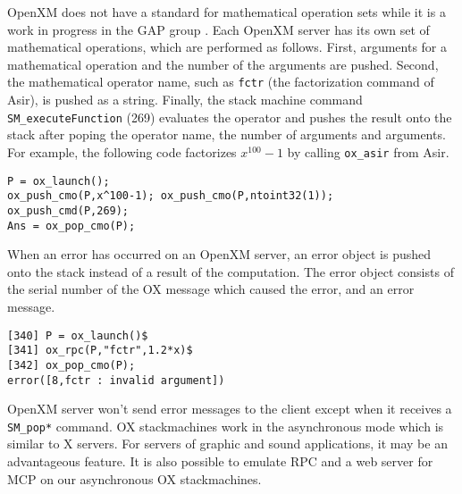 OpenXM does not have a standard for mathematical operation sets
while it is a work in progress in the GAP group \cite{gap}.
Each OpenXM server has its own set of mathematical operations,
which are performed as follows.
First, arguments for a mathematical operation
and the number of the arguments are pushed.
Second, 
the mathematical operator name, 
such as {\tt fctr} (the factorization command of Asir),
is pushed as a string.
Finally, the stack machine command
{\tt SM\_executeFunction} (269) evaluates the operator and
pushes the result onto the stack
after poping the operator name, the number of arguments
and arguments.
For example, the following code factorizes $x^{100}-1$ by calling
{\tt ox\_asir} from Asir.
\begin{verbatim}
P = ox_launch(); 
ox_push_cmo(P,x^100-1); ox_push_cmo(P,ntoint32(1));
ox_push_cmd(P,269); 
Ans = ox_pop_cmo(P);
\end{verbatim}

When an error has occurred on an OpenXM server,
an error object is pushed onto the stack 
instead of a result of the computation.
The error object consists of the serial number of the OX message
which caused the error, and an error message.
\begin{verbatim}
[340] P = ox_launch()$
[341] ox_rpc(P,"fctr",1.2*x)$
[342] ox_pop_cmo(P);
error([8,fctr : invalid argument])
\end{verbatim}

OpenXM server won't send error messages to the client
except when it receives a {\tt SM\_pop*} command.
OX stackmachines work in the asynchronous mode which is similar 
to X servers.
For servers of graphic and sound applications, 
it may be an advantageous feature.
It is also possible to emulate RPC and a web server for MCP \cite{iamc} 
on our asynchronous OX stackmachines.





